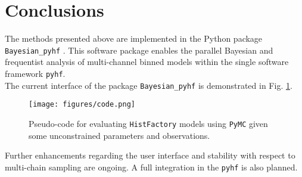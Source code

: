 \section{Conclusions}\label{sec:conclusions}

The methods presented above are implemented in the Python package \texttt{Bayesian\_pyhf} \cite{BayesianPyhf}. This software package enables the parallel Bayesian and frequentist analysis of multi-channel binned models within the single software framework \texttt{pyhf}. \\
The current interface of the package \texttt{Bayesian\_pyhf} is demonstrated in Fig. \ref{code}.
    \begin{figure} %
        \centering
        \texttt{[image: figures/code.png]}
        \centering
        \caption{Pseudo-code for evaluating \texttt{HistFactory} models using \texttt{PyMC} given some unconstrained parameters and observations.}
        \label{code}
    \end{figure}
\noindent Further enhancements regarding the user interface and stability with respect to multi-chain sampling are ongoing. A full integration in the \texttt{pyhf} is also planned.
